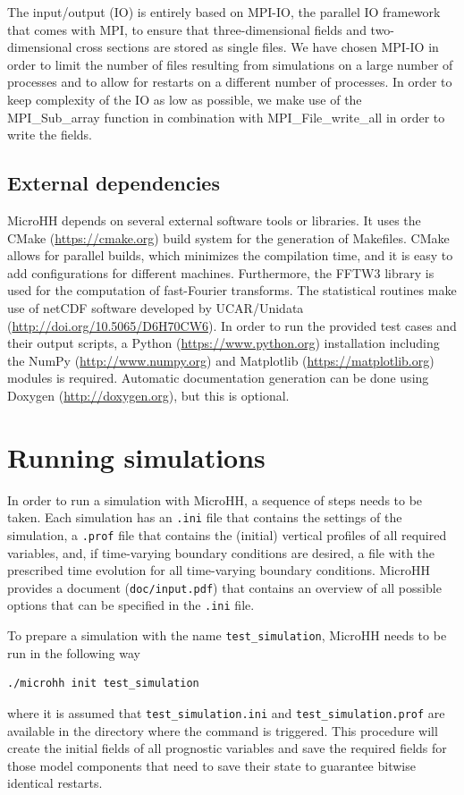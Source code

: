 \documentclass[gmd,manuscript]{copernicus}
\begin{document}
The input/output (IO) is entirely based on MPI-IO, the parallel IO framework that comes with MPI, to ensure that three-dimensional fields and two-dimensional cross sections are stored as single files. We have chosen MPI-IO in order to limit the number of files resulting from simulations on a large number of processes and to allow for restarts on a different number of processes. In order to keep complexity of the IO as low as possible, we make use of the MPI\_Sub\_array function in combination with MPI\_File\_write\_all in order to write the fields.

\subsection{External dependencies}
MicroHH depends on several external software tools or libraries. It uses the CMake (\url{https://cmake.org}) build system for the generation of Makefiles. CMake allows for parallel builds, which minimizes the compilation time, and it is easy to add configurations for different machines. Furthermore, the FFTW3 library \citep{Frigo2005} is used for the computation of fast-Fourier transforms. The statistical routines make use of netCDF software developed by UCAR/Unidata (\url{http://doi.org/10.5065/D6H70CW6}). In order to run the provided test cases and their output scripts, a Python (\url{https://www.python.org}) installation including the NumPy (\url{http://www.numpy.org}) and Matplotlib (\url{https://matplotlib.org}) modules is required. Automatic documentation generation can be done using Doxygen (\url{http://doxygen.org}), but this is optional.

\section{Running simulations}\label{sec:running}
\label{sec:running_simulations}
In order to run a simulation with MicroHH, a sequence of steps needs to be taken. Each simulation has an \texttt{.ini} file that contains the settings of the simulation, a \texttt{.prof} file that contains the (initial) vertical profiles of all required variables, and, if time-varying boundary conditions are desired, a file with the prescribed time evolution for all time-varying boundary conditions. MicroHH provides a document (\texttt{doc/input.pdf}) that contains an overview of all possible options that can be specified in the \texttt{.ini} file.

To prepare a simulation with the name \texttt{test\_simulation}, MicroHH needs to be run in the following way
\begin{verbatim}
./microhh init test_simulation
\end{verbatim}
where it is assumed that \texttt{test\_simulation.ini} and \texttt{test\_simulation.prof} are available in the directory where the command is triggered. This procedure will create the initial fields of all prognostic variables and save the required fields for those model components that need to save their state to guarantee bitwise identical restarts. 
\end{document}
